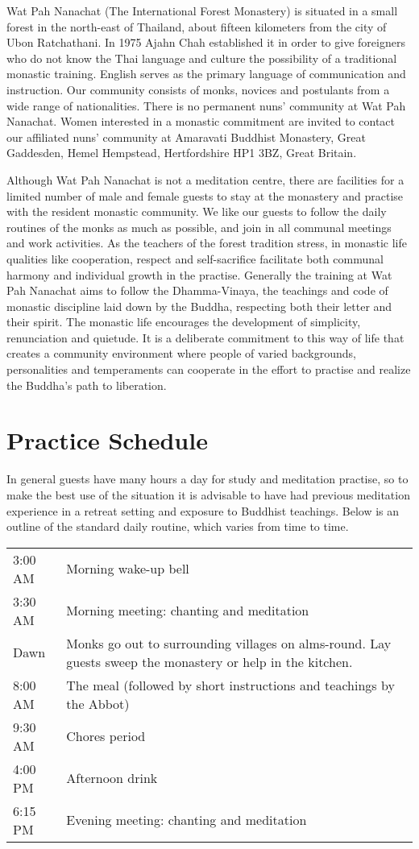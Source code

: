 
Wat Pah Nanachat (The International Forest Monastery) is situated in a
small forest in the north-east of Thailand, about fifteen kilometers
from the city of Ubon Ratchathani. In 1975 Ajahn Chah established it in
order to give foreigners who do not know the Thai language and culture
the possibility of a traditional monastic training. English serves as
the primary language of communication and instruction. Our community
consists of monks, novices and postulants from a wide range of
nationalities. There is no permanent nuns' community at Wat Pah
Nanachat. Women interested in a monastic commitment are invited to
contact our affiliated nuns' community at Amaravati Buddhist Monastery,
Great Gaddesden, Hemel Hempstead, Hertfordshire HP1 3BZ, Great Britain.

Although Wat Pah Nanachat is not a meditation centre, there are
facilities for a limited number of male and female guests to stay at the
monastery and practise with the resident monastic community. We like our
guests to follow the daily routines of the monks as much as possible,
and join in all communal meetings and work activities. As the teachers
of the forest tradition stress, in monastic life qualities like
cooperation, respect and self-sacrifice facilitate both communal harmony
and individual growth in the practise. Generally the training at Wat Pah
Nanachat aims to follow the Dhamma-Vinaya, the teachings and code of
monastic discipline laid down by the Buddha, respecting both their
letter and their spirit. The monastic life encourages the development of
simplicity, renunciation and quietude. It is a deliberate commitment to
this way of life that creates a community environment where people of
varied backgrounds, personalities and temperaments can cooperate in the
effort to practise and realize the Buddha's path to liberation.

\section{Practice Schedule}

In general guests have many hours a day for study and meditation
practise, so to make the best use of the situation it is advisable to
have had previous meditation experience in a retreat setting and
exposure to Buddhist teachings.  Below is an outline of the standard
daily routine, which varies from time to time.

\begin{tabular}{l p{80mm}}
3:00 AM & Morning wake-up bell\\
3:30 AM & Morning meeting: chanting and meditation\\
Dawn & Monks go out to surrounding villages on alms-round. Lay guests sweep the monastery or help in the kitchen.\\
8:00 AM & The meal (followed by short instructions and teachings by the Abbot)\\
9:30 AM & Chores period\\
4:00 PM & Afternoon drink\\
6:15 PM & Evening meeting: chanting and meditation\\
\end{tabular}

